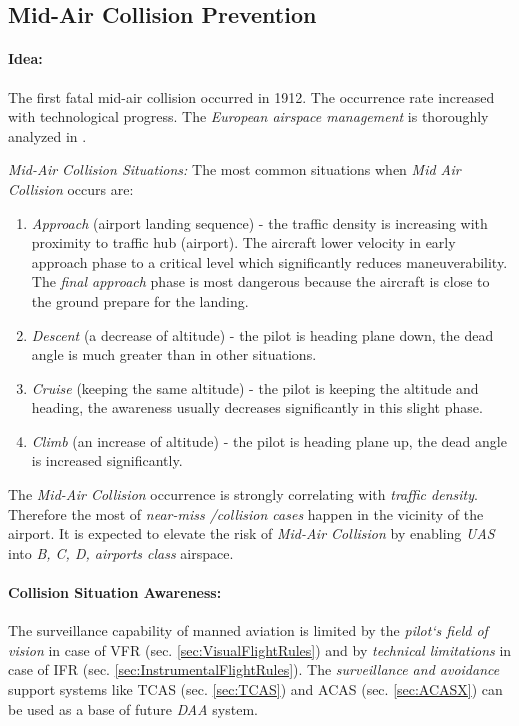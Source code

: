 \subsection{Mid-Air Collision Prevention}\label{sec:MidairCollisionPrevention}
\paragraph{Idea:} The first fatal mid-air collision occurred in 1912. The occurrence rate increased with technological progress. The \emph{European airspace management} is thoroughly analyzed in \cite{cook2007european}. 

\emph{Mid-Air Collision Situations:} The most common situations when \emph{Mid Air Collision} occurs are:

\begin{enumerate}
    \item \emph{Approach} (airport landing sequence) - the traffic density is increasing with proximity to traffic hub (airport). The aircraft lower velocity in early approach phase to a critical level which significantly reduces maneuverability. The \emph{final approach} phase is most dangerous because the aircraft is close to the ground prepare for the landing.  
    
    \item \emph{Descent} (a decrease of altitude) - the pilot is heading plane down, the dead angle is much greater than in other situations.
    
    \item \emph{Cruise}  (keeping the same altitude) - the pilot is  keeping the altitude and heading, the awareness usually decreases significantly in this slight phase. 

    \item \emph{Climb} (an increase of altitude) - the pilot is heading plane up, the dead angle is increased significantly. 
\end{enumerate}

\begin{note}
    The \emph{Mid-Air Collision} occurrence is strongly correlating with \emph{traffic density}. Therefore the most of \emph{near-miss /collision cases} happen in the vicinity of the airport. It is expected to elevate the risk of \emph{Mid-Air Collision} by enabling \emph{UAS} into \emph{B, C, D, airports class}  airspace.
\end{note}

\paragraph{Collision Situation Awareness:} The surveillance capability of manned aviation is limited by the \emph{pilot`s field of vision} in case of VFR (sec. \ref{sec:VisualFlightRules}) and by \emph{technical limitations} in case of IFR (sec. \ref{sec:InstrumentalFlightRules}). The \emph{surveillance and avoidance} support systems like TCAS (sec. \ref{sec:TCAS}) and ACAS (sec. \ref{sec:ACASX}) can be used as a base of future \emph{DAA} system.

